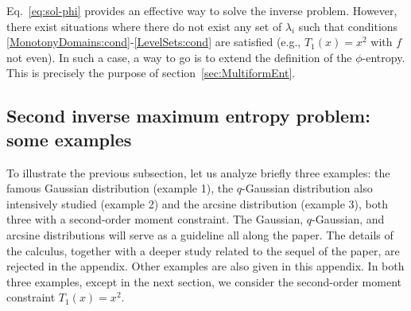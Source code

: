 \documentclass[entropy,article,submit,moreauthors,pdftex]{Definitions/mdpi}
\newcommand{\jfb}[1]{{\color{red} #1}}                                       %
\begin{document}
Eq.~\eqref{eq:sol-phi}  provides   an  effective   way  to  solve   the  inverse
problem. However,  there exist situations  where there do  not exist any  set of
$\lambda_i$ such that conditions \ref{MonotonyDomains:cond}-\ref{LevelSets:cond}
are satisfied (e.g., $T_1(x) = x^2$ with $f$ not even). In such a case, a way to
go is  to extend the  definition of the  $\phi$-entropy.  This is  precisely the
purpose of section~\ref{sec:MultiformEnt}.




\subsection{Second inverse maximum entropy problem: some examples}
\label{subsec:MaxPhiEntExamples}

To illustrate  the previous subsection,  let us analyze briefly  three examples:
the famous Gaussian distribution (example 1), the $q$-Gaussian distribution also
intensively studied (example  2) and the arcsine distribution  (example 3), both
three with  a second-order moment  constraint.  The Gaussian,  $q$-Gaussian, and
arcsine distributions will serve as a guideline all along the paper. The details
of the  calculus, together  with a  deeper study  related to  the sequel  of the
paper,  are rejected  in the  appendix. Other  examples are  also given  in this
appendix. In  both three examples, except  in the next section,  we consider the
second-order moment constraint $T_1(x) = x^2$.

\end{document}
